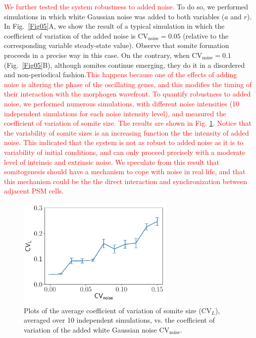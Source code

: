 \documentclass[%
 preprint,
 aip, 
 amsmath,amssymb,
]{revtex4-2}
\begin{document}
\textcolor{red}{We further tested the system robustness to added noise.} To do so, we performed simulations in which white Gaussian noise was added to both variables ($a$ and $r$). In Fig.~\ref{Fig05}A, we show the result of a typical simulation in which the coefficient of variation of the added noise is $\text{CV}_{\text{noise}}= 0.05$ (relative to the corresponding variable steady-state value). Observe that somite formation proceeds in a precise way in this case. On the contrary, when $\text{CV}_{\text{noise}} = 0.1$ (Fig.~\ref{Fig05}B), although somites continue emerging, they do it in a disordered and non-periodical fashion.\textcolor{red}{This happens because one of the effects of adding noise is altering the phase of the oscillating genes, and this modifies the timing of their interaction with the morphogen wavefront. To quantify robustness to added noise, we performed numerous simulations, with different noise intensities (10 independent simulations for each noise intensity level), and measured the coefficient of variation of somite size. The results are shown in Fig. \ref{Fig06_2}. Notice that the variability of somite sizes is an increasing function the the intensity of added noise. This indicated that the system is not as robust to added noise as it is to variability of initial conditions, and can only proceed precisely with a moderate level of intrinsic and extrinsic noise. We speculate from this result that somitogenesis should have a mechanism to cope with noise in real life, and that this mechanism could be the the direct interaction and synchronization between adjacent PSM cells.}

\begin{figure}
	\centering
	\includegraphics[width=3in]{Figures/Fig06_2}
	\caption{Plots of the average coefficient of variation of somite size ($\text{CV}_L$), averaged over 10 independent simulations, vs. the coefficient of variation of the added white Gaussian noise $\text{CV}_{\text{noise}}$.}
	\label{Fig06_2}
\end{figure}
\end{document}
